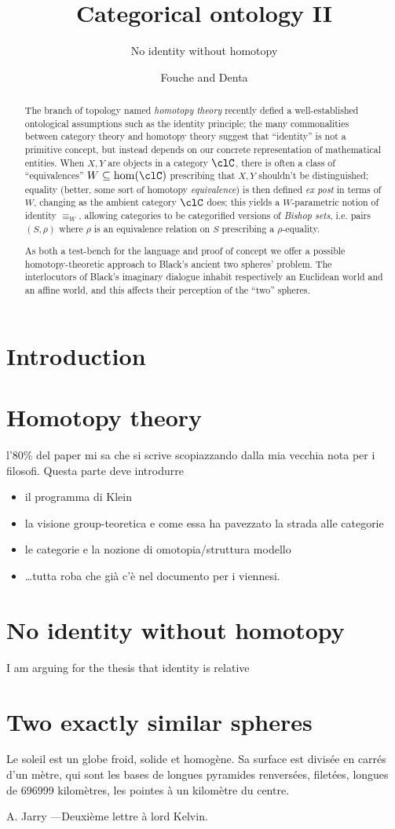 \documentclass{amsart}
\author{Fouche and Denta}
\title{Categorical ontology II}
\subtitle{No identity without homotopy}
\begin{document}
\maketitle
\begin{abstract}
  The branch of topology named \emph{homotopy theory} recently defied a well\hyp{}established ontological assumptions such as the identity principle; the many commonalities between category theory and homotopy theory suggest that ``identity'' is not a primitive concept, but instead depends on our concrete representation of mathematical entities. When $X,Y$ are objects in a category $\clC$, there is often a class of ``equivalences'' $W \subseteq \hom(\clC)$ prescribing that $X,Y$ shouldn't be distinguished; equality (better, some sort of homotopy \emph{equivalence}) is then defined \emph{ex post} in terms of $W$, changing as the ambient category $\clC$ does; this yields a $W$-parametric notion of identity $\equiv_W$, allowing categories to be categorified versions of \emph{Bishop sets}, i.e. pairs $(S,\rho)$ where $\rho$ is an equivalence relation on $S$ prescribing a $\rho$-equality.

  As both a test-bench for the language and proof of concept we offer a possible homotopy-theoretic approach to Black's ancient two spheres' problem. The interlocutors of Black's imaginary dialogue inhabit respectively an Euclidean world and an affine world, and this affects their perception of the ``two'' spheres.
\end{abstract}
\section{Introduction}
\section{Homotopy theory}
l'80\% del paper mi sa che si scrive scopiazzando dalla mia vecchia nota per i filosofi. Questa parte deve introdurre
\begin{itemize}
  \item il programma di Klein 
  \item la visione group-teoretica e come essa ha pavezzato la strada alle categorie
  \item le categorie e la nozione di omotopia/struttura modello
  \item \dots tutta roba che già c'è nel documento per i viennesi.
\end{itemize}
\section{No identity without homotopy}
\epigraph{I am arguing for the thesis that identity is relative}{\cite{}}
\section{Two exactly similar spheres}
\epigraph{Le soleil est un globe froid, solide et homogène. Sa surface est divisée en carrés d’un mètre, qui sont les bases de longues pyramides renversées, filetées, longues de 696999 kilomètres, les pointes à un kilomètre du centre. }{A. Jarry ---Deuxième lettre à lord Kelvin.}
\end{document}
